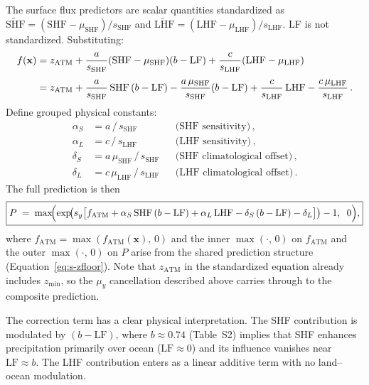 The surface flux predictors are scalar quantities standardized as
$\widetilde{\mathrm{SHF}} = (\mathrm{SHF} -
\mu_{\mathrm{SHF}})/s_{\mathrm{SHF}}$ and $\widetilde{\mathrm{LHF}} =
(\mathrm{LHF} - \mu_{\mathrm{LHF}})/s_{\mathrm{LHF}}$.  LF is not
standardized.  Substituting:
%
\begin{align}
  f(\mathbf{x}) &= z_{\mathrm{ATM}}
    + \frac{a}{s_{\mathrm{SHF}}}(\mathrm{SHF} - \mu_{\mathrm{SHF}})
      (b - \mathrm{LF})
    + \frac{c}{s_{\mathrm{LHF}}}(\mathrm{LHF} - \mu_{\mathrm{LHF}})
    \notag\\[4pt]
    &= z_{\mathrm{ATM}}
    + \frac{a}{s_{\mathrm{SHF}}}\,\mathrm{SHF}\,(b - \mathrm{LF})
    - \frac{a\,\mu_{\mathrm{SHF}}}{s_{\mathrm{SHF}}}(b - \mathrm{LF})
    + \frac{c}{s_{\mathrm{LHF}}}\,\mathrm{LHF}
    - \frac{c\,\mu_{\mathrm{LHF}}}{s_{\mathrm{LHF}}}\,.
  \label{eq:s-srsfc-expand}
\end{align}
%
Define grouped physical constants:
%
\begin{equation}
  \begin{aligned}
    \alpha_S &= a\,/\,s_{\mathrm{SHF}} &&\text{(SHF sensitivity)}\,,\\
    \alpha_L &= c\,/\,s_{\mathrm{LHF}} &&\text{(LHF sensitivity)}\,,\\
    \delta_S &= a\,\mu_{\mathrm{SHF}}\,/\,s_{\mathrm{SHF}}
             &&\text{(SHF climatological offset)}\,,\\
    \delta_L &= c\,\mu_{\mathrm{LHF}}\,/\,s_{\mathrm{LHF}}
             &&\text{(LHF climatological offset)}\,.
  \end{aligned}
  \label{eq:s-srsfc-constants}
\end{equation}
%
The full prediction is then
%
\begin{equation}
  \boxed{P \;=\; \max\!\Bigl(\exp\!\bigl(
    s_y\bigl[f_{\mathrm{ATM}}
    + \alpha_S\,\mathrm{SHF}\,(b - \mathrm{LF})
    + \alpha_L\,\mathrm{LHF}
    - \delta_S\,(b - \mathrm{LF})
    - \delta_L\bigr]\bigr) - 1,\;\;0\Bigr),}
  \label{eq:s-srsfc-phys}
\end{equation}
%
where $f_{\mathrm{ATM}} = \max(f_{\mathrm{ATM}}(\mathbf{x}),\,0)$ and the
inner $\max(\cdot,\,0)$ on $f_{\mathrm{ATM}}$ and the outer
$\max(\cdot,\,0)$ on $P$ arise from the shared prediction structure
(Equation~\ref{eq:s-zfloor}).  Note that $z_{\mathrm{ATM}}$ in the
standardized equation already includes $z_{\min}$, so the $\mu_y$
cancellation described above carries through to the composite prediction.

The correction term has a clear physical interpretation.  The SHF contribution
is modulated by $(b - \mathrm{LF})$, where $b \approx 0.74$ (Table~S2)
implies that SHF enhances precipitation primarily over ocean ($\mathrm{LF}
\approx 0$) and its influence vanishes near $\mathrm{LF} \approx b$.  The
LHF contribution enters as a linear additive term with no land--ocean
modulation.


